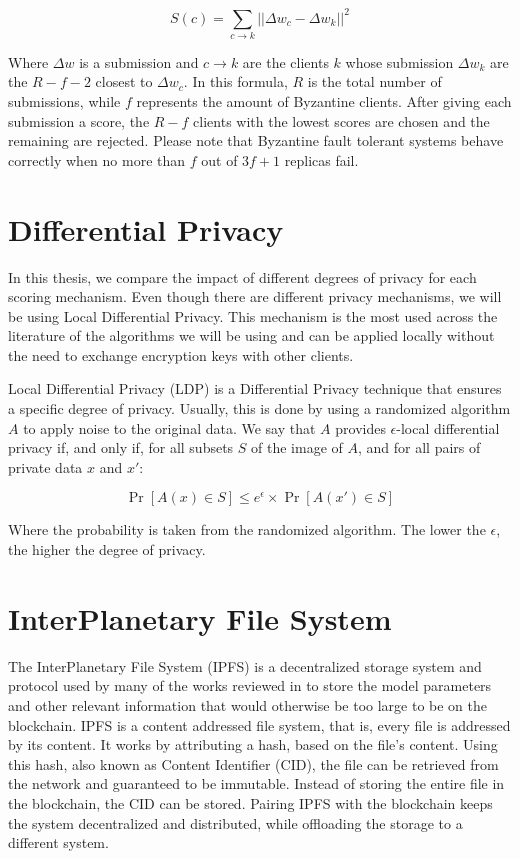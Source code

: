 \begin{equation}
    \label{eq:multi-krum}
    S(c)=\sum_{c \rightarrow k} || \Delta w_c - \Delta w_k|| ^2
\end{equation}

Where $\Delta w$ is a submission and $c \rightarrow k$ are the clients $k$ whose submission $\Delta w_k$ are the $R-f-2$ closest to $\Delta w_c$. In this formula, $R$ is the total number of submissions, while $f$ represents the amount of Byzantine clients. After giving each submission a score, the $R-f$ clients with the lowest scores are chosen and the remaining are rejected. Please note that Byzantine fault tolerant systems behave correctly when no more than $f$ out of $3f+1$ replicas fail.

\section{Differential Privacy}\label{background:diff_priv}

In this thesis, we compare the impact of different degrees of privacy for each scoring mechanism. Even though there are different privacy mechanisms, we will be using Local Differential Privacy. This mechanism is the most used across the literature of the algorithms we will be using and can be applied locally without the need to exchange encryption keys with other clients.

Local Differential Privacy (LDP) is a Differential Privacy technique that ensures a specific degree of privacy. Usually, this is done by using a randomized algorithm $A$ to apply noise to the original data. We say that $A$ provides $\epsilon$-local differential privacy if, and only if, for all subsets $S$ of the image of $A$, and for all pairs of private data $x$ and $x'$:

\begin{equation}
    \label{eq:e-ldp}
    \Pr[A(x) \in S] \leq e^\epsilon \times \Pr[A(x') \in S]
\end{equation}

Where the probability is taken from the randomized algorithm. The lower the $\epsilon$, the higher the degree of privacy.

\section{InterPlanetary File System}\label{background:ipfs}

The InterPlanetary File System (IPFS) \cite{10.48550/arxiv.1407.3561} is a decentralized storage system and protocol used by many of the works reviewed in  to store the model parameters and other relevant information that would otherwise be too large to be on the blockchain. IPFS is a content addressed file system, that is, every file is addressed by its content. It works by attributing a hash, based on the file's content. Using this hash, also known as Content Identifier (CID), the file can be retrieved from the network and guaranteed to be immutable. Instead of storing the entire file in the blockchain, the CID can be stored. Pairing IPFS with the blockchain keeps the system decentralized and distributed, while offloading the storage to a different system.
